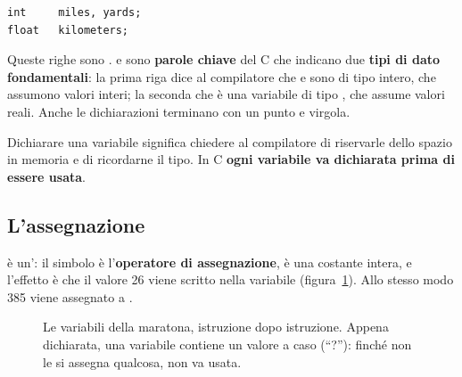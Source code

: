 \begin{lstlisting}[style=c]
int     miles, yards;
float   kilometers;
\end{lstlisting}

Queste righe sono .  e  sono
\textbf{parole chiave} del C che indicano due \textbf{tipi di dato
fondamentali}: la prima riga dice al compilatore che  e
 sono  di tipo intero, che assumono valori
interi; la seconda che  è una variabile di tipo
, che assume valori reali. Anche le dichiarazioni terminano con
un punto e virgola.

Dichiarare una variabile significa chiedere al compilatore di riservarle
dello spazio in memoria e di ricordarne il tipo. In C \textbf{ogni
variabile va dichiarata prima di essere usata}.

\subsection{L'assegnazione}

 è un': il simbolo
\code{=} è l'\textbf{operatore di assegnazione},  è una costante
intera, e l'effetto è che il valore 26 viene scritto nella variabile
 (figura~\ref{fig:maratona-memoria}). Allo stesso modo 385 viene
assegnato a .


\begin{figure}[H]
  \centering
  \caption{Le variabili della maratona, istruzione dopo istruzione. Appena
           dichiarata, una variabile contiene un valore a caso (“?”):
           finché non le si assegna qualcosa, non va usata.}
  \label{fig:maratona-memoria}
\end{figure}

